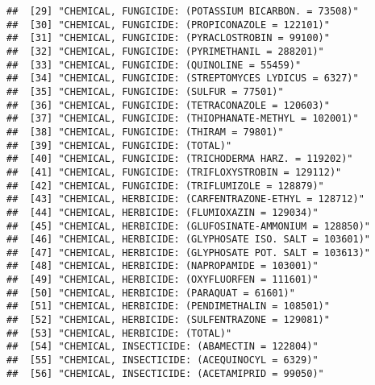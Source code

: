 \documentclass[
]{article}
\begin{document}
\begin{verbatim}
##  [29] "CHEMICAL, FUNGICIDE: (POTASSIUM BICARBON. = 73508)"                                
##  [30] "CHEMICAL, FUNGICIDE: (PROPICONAZOLE = 122101)"                                     
##  [31] "CHEMICAL, FUNGICIDE: (PYRACLOSTROBIN = 99100)"                                     
##  [32] "CHEMICAL, FUNGICIDE: (PYRIMETHANIL = 288201)"                                      
##  [33] "CHEMICAL, FUNGICIDE: (QUINOLINE = 55459)"                                          
##  [34] "CHEMICAL, FUNGICIDE: (STREPTOMYCES LYDICUS = 6327)"                                
##  [35] "CHEMICAL, FUNGICIDE: (SULFUR = 77501)"                                             
##  [36] "CHEMICAL, FUNGICIDE: (TETRACONAZOLE = 120603)"                                     
##  [37] "CHEMICAL, FUNGICIDE: (THIOPHANATE-METHYL = 102001)"                                
##  [38] "CHEMICAL, FUNGICIDE: (THIRAM = 79801)"                                             
##  [39] "CHEMICAL, FUNGICIDE: (TOTAL)"                                                      
##  [40] "CHEMICAL, FUNGICIDE: (TRICHODERMA HARZ. = 119202)"                                 
##  [41] "CHEMICAL, FUNGICIDE: (TRIFLOXYSTROBIN = 129112)"                                   
##  [42] "CHEMICAL, FUNGICIDE: (TRIFLUMIZOLE = 128879)"                                      
##  [43] "CHEMICAL, HERBICIDE: (CARFENTRAZONE-ETHYL = 128712)"                               
##  [44] "CHEMICAL, HERBICIDE: (FLUMIOXAZIN = 129034)"                                       
##  [45] "CHEMICAL, HERBICIDE: (GLUFOSINATE-AMMONIUM = 128850)"                              
##  [46] "CHEMICAL, HERBICIDE: (GLYPHOSATE ISO. SALT = 103601)"                              
##  [47] "CHEMICAL, HERBICIDE: (GLYPHOSATE POT. SALT = 103613)"                              
##  [48] "CHEMICAL, HERBICIDE: (NAPROPAMIDE = 103001)"                                       
##  [49] "CHEMICAL, HERBICIDE: (OXYFLUORFEN = 111601)"                                       
##  [50] "CHEMICAL, HERBICIDE: (PARAQUAT = 61601)"                                           
##  [51] "CHEMICAL, HERBICIDE: (PENDIMETHALIN = 108501)"                                     
##  [52] "CHEMICAL, HERBICIDE: (SULFENTRAZONE = 129081)"                                     
##  [53] "CHEMICAL, HERBICIDE: (TOTAL)"                                                      
##  [54] "CHEMICAL, INSECTICIDE: (ABAMECTIN = 122804)"                                       
##  [55] "CHEMICAL, INSECTICIDE: (ACEQUINOCYL = 6329)"                                       
##  [56] "CHEMICAL, INSECTICIDE: (ACETAMIPRID = 99050)"                                      

\end{verbatim}
\end{document}
